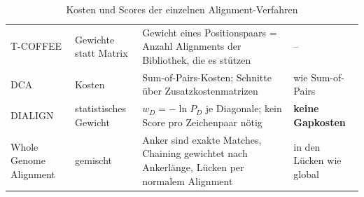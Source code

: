 \begin{table}[H]
\begin{tabular}{>{\raggedright\arraybackslash}p{2.5cm}
            >{\raggedright\arraybackslash}p{1.9cm}
            >{\raggedright\arraybackslash}p{4.3cm}
            >{\raggedright\arraybackslash}p{2.3cm}}
        T-COFFEE & Gewichte statt Matrix & Gewicht eines Positionspaars = Anzahl Alignments der Bibliothek, die es stützen & -- \\
        DCA & Kosten & Sum-of-Pairs-Kosten; Schnitte über Zusatzkostenmatrizen & wie Sum-of-Pairs \\
        DIALIGN & statistisches Gewicht & $w_D = -\ln P_D$ je Diagonale; kein Score pro Zeichenpaar nötig & \textbf{keine Gapkosten} \\
        Whole Genome Alignment & gemischt & Anker sind exakte Matches, Chaining gewichtet nach Ankerlänge, Lücken per normalem Alignment & in den Lücken wie global \\
        \bottomrule
    \end{tabular}
    \caption{Kosten und Scores der einzelnen Alignment-Verfahren}
    \label{tab:kosten-scores}
\end{table}



\subsection{}






